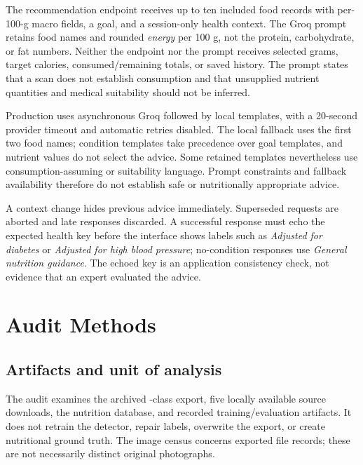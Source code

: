 \documentclass[12pt,journal,draftclsnofoot,onecolumn]{IEEEtran}
\begin{document}
The recommendation endpoint receives up to ten included food records with per-100-g macro fields, a goal, and a session-only health context. The Groq prompt retains food names and rounded \emph{energy} per 100 g, not the protein, carbohydrate, or fat numbers. Neither the endpoint nor the prompt receives selected grams, target calories, consumed/remaining totals, or saved history. The prompt states that a scan does not establish consumption and that unsupplied nutrient quantities and medical suitability should not be inferred.

Production uses asynchronous Groq followed by local templates, with a 20-second provider timeout and automatic retries disabled. The local fallback uses the first two food names; condition templates take precedence over goal templates, and nutrient values do not select the advice. Some retained templates nevertheless use consumption-assuming or suitability language. Prompt constraints and fallback availability therefore do not establish safe or nutritionally appropriate advice.

A context change hides previous advice immediately. Superseded requests are aborted and late responses discarded. A successful response must echo the expected health key before the interface shows labels such as \emph{Adjusted for diabetes} or \emph{Adjusted for high blood pressure}; no-condition responses use \emph{General nutrition guidance}. The echoed key is an application consistency check, not evidence that an expert evaluated the advice.

\section{Audit Methods}
\subsection{Artifacts and unit of analysis}
The audit examines the archived \AuditClasses{}-class export, five locally available source downloads, the nutrition database, and recorded training/evaluation artifacts. It does not retrain the detector, repair labels, overwrite the export, or create nutritional ground truth. The image census concerns exported file records; these are not necessarily distinct original photographs.
\end{document}

